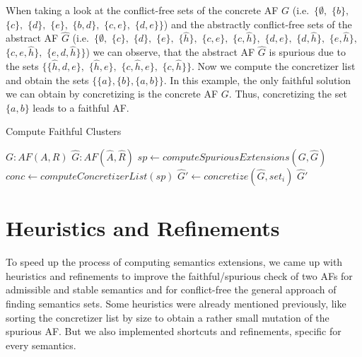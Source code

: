 When taking a look at the conflict-free sets of the concrete AF $G$ (i.e.\ $\bigl\{ \emptyset,$ $\{b\},$ $\{c\},$ $\{d\},$ $\{e\},$ $\{b, d\},$  $\{c, e\},$ $\{d, e\} \bigl\}$) and the abstractly conflict-free sets of the abstract AF $\hat{G}$ (i.e.\ $\bigl\{ \emptyset,$ $\{c\},$ $\{d\},$ $\{e\},$ $\{\hat{h}\},$ $\{c, e\},$ $\{c, \hat{h}\},$ $\{d, e\},$ $\{d, \hat{h}\},$ $\{e, \hat{h}\},$ $\{c, e, \hat{h}\},$ $\{e, d, \hat{h}\} \bigl\}$) we can observe, that the abstract AF $\hat{G}$ is spurious due to the sets $\bigl\{\{\hat{h}, d, e\},$ $\{\hat{h}, e\},$ $\{c, \hat{h}, e\},$ $\{c, \hat{h}\}\bigl\}$. Now we compute the concretizer list and obtain the sets $\bigl\{ \{a\}, \{b\}, \{a, b\}\bigl\}$. In this example, the only faithful solution we can obtain by concretizing is the concrete AF $G$. Thus, concretizing the set $\{a, b\}$ leads to a faithful AF.
\vspace{0.5cm}

\begin{algorithm}
    \caption{Compute Faithful Clusters}\label{alg:computeFaithfulClusters}
    \begin{algorithmic}[1]
        \Require $G: AF(A, R)$ 
        \Require $\hat{G}: AF(\hat{A}, \hat{R})$ 
        \State $sp \gets computeSpuriousExtensions(G, \hat{G})$
        \State $conc \gets computeConcretizerList(sp)$
            \State $\hat{G}' \gets concretize(\hat{G}, set_i)$
                \State \Return $\hat{G}'$
            \EndIf
        \EndFor
    \end{algorithmic}
\end{algorithm}



\newpage
\section{Heuristics and Refinements}
\label{sec:HeuristicsAndRefinements}

To speed up the process of computing semantics extensions, we came up with heuristics and refinements to improve the faithful/spurious check of two AFs for admissible and stable semantics and for conflict-free the general approach of finding semantics sets. Some heuristics were already mentioned previously, like sorting the concretizer list by size to obtain a rather small mutation of the spurious AF. But we also implemented shortcuts and refinements, specific for every semantics.

